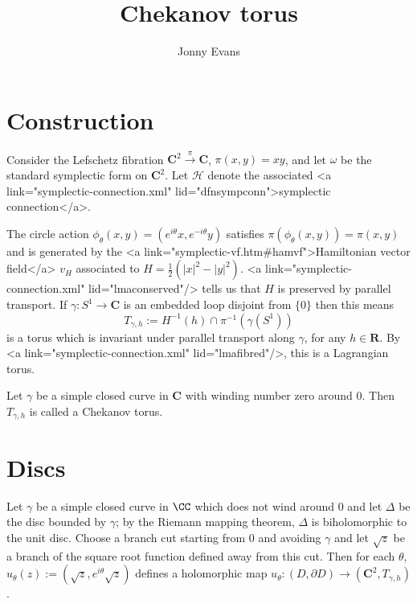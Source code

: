 \documentclass{amsart}
\title{Chekanov torus}
\author{Jonny Evans}
\begin{document}
\section{Construction}

Consider the Lefschetz fibration $\mathbf{C}^2\stackrel{\pi}{\to}{\mathbf{C}}$, $\pi(x,y)=xy$, and let $\omega$ be the standard symplectic form on $\mathbf{C}^2$. Let $\mathcal{H}$ denote the associated <a link="symplectic-connection.xml" lid="dfnsympconn">symplectic connection</a>.
      
The circle action $\phi_\theta(x,y)=(e^{i\theta}x,e^{-i\theta}y)$ satisfies $\pi(\phi_\theta(x,y))=\pi(x,y)$ and is generated by the <a link="symplectic-vf.htm#hamvf">Hamiltonian vector field</a> $v_H$ associated to $H=\frac{1}{2}\left(|x|^2-|y|^2\right)$. <a link="symplectic-connection.xml" lid="lmaconserved"/> tells us that $H$ is preserved by parallel transport. If $\gamma\colon S^1\to\mathbf{C}$ is an embedded loop disjoint from $\{0\}$ then this means
\[T_{\gamma,h}:=H^{-1}(h)\cap\pi^{-1}(\gamma(S^1))\]
is a torus which is invariant under parallel transport along $\gamma$, for any $h\in\mathbf{R}$. By <a link="symplectic-connection.xml" lid="lmafibred"/>, this is a Lagrangian torus.

\begin{Definition}
Let $\gamma$ be a simple closed curve in $\mathbf{C}$ with winding number zero around $0$. Then $T_{\gamma,h}$ is called a Chekanov torus.
\end{Definition}

\section{Discs}

Let $\gamma$ be a simple closed curve in $\CC$ which does not wind around $0$ and let $\Delta$ be the disc bounded by $\gamma$; by the Riemann mapping theorem, $\Delta$ is biholomorphic to the unit disc. Choose a branch cut starting from $0$ and avoiding $\gamma$ and let $\sqrt{z}$ be a branch of the square root function defined away from this cut. Then for each $\theta$, $u_\theta(z):=\left(\sqrt{z},e^{i\theta}\sqrt{z}\right)$ defines a holomorphic map $u_\theta\colon\left(D,\partial D\right)\to\left(\mathbf{C}^2,T_{\gamma,h}\right)$.
  
\end{document}
